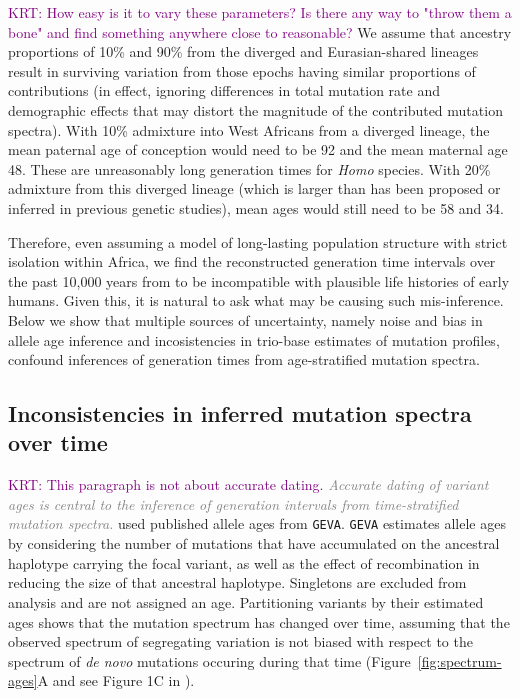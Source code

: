 \documentclass[]{article}
\newcommand{\krtcomment}[1]{{\textcolor{purple}{KRT: #1}}}
\newcommand{\krtedit}[2]{{\emph{\textcolor{gray}{#1}}}{\textcolor{purple}{#2}}}
\newcommand{\GEVA}{\texttt{GEVA}\xspace}
\begin{document}
\krtcomment{How easy is it to vary these parameters? Is there any way to "throw 
them a bone" and find something anywhere close to reasonable?}
We assume that ancestry proportions of 10\% and 90\% from the diverged and
Eurasian-shared lineages result in surviving variation from those epochs having
similar proportions of contributions (in effect, ignoring differences in total
    mutation rate and demographic effects that may distort the magnitude of the
contributed mutation spectra). With 10\% admixture into West Africans from a
diverged lineage, the mean paternal age of conception would need to be 92 and
the mean maternal age 48. These are unreasonably long generation times for
\emph{Homo} species. With 20\% admixture from this diverged lineage (which is
larger than has been proposed or inferred in previous genetic studies), mean
ages would still need to be 58 and 34.

Therefore, even assuming a model of long-lasting population structure with
strict isolation within Africa, we find the reconstructed generation time
intervals over the past 10,000 years from \citet{wang2023human} to be
incompatible with plausible life histories of early humans. Given this, it is
natural to ask what may be causing such mis-inference. Below we show that
multiple sources of uncertainty, namely noise and bias in allele age inference
and incosistencies in trio-base estimates of mutation profiles, confound
inferences of generation times from age-stratified mutation spectra.

\subsection*{Inconsistencies in inferred mutation spectra over time}

\krtcomment{This paragraph is not about accurate dating.}
\krtedit{Accurate dating of variant ages is central to the inference of generation
intervals from time-stratified mutation spectra.}{} \citet{wang2023human} used
published allele ages from \GEVA \citep{albers2020dating}. \GEVA estimates
allele ages by considering the number of mutations that have accumulated on the
ancestral haplotype carrying the focal variant, as well as the effect of
recombination in reducing the size of that ancestral haplotype. Singletons are
excluded from analysis and are not assigned an age. Partitioning variants by
their estimated ages shows that the mutation spectrum has changed over time,
assuming that the observed spectrum of segregating variation is not biased with
respect to the spectrum of \emph{de novo} mutations occuring during that time
(Figure~\ref{fig:spectrum-ages}A and see Figure 1C in \citet{wang2023human}).
\end{document}

